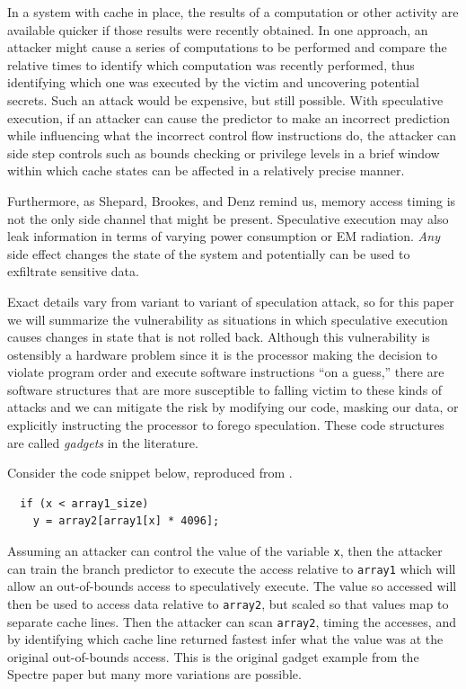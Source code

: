 \documentclass[11pt,conference]{IEEEtran}
\begin{document}
In a system with cache in place, the results of a computation or other activity are available quicker if those results were recently obtained.
In one approach, an attacker might cause a series of computations to be performed and compare the relative times to identify which computation was recently performed, thus identifying which one was executed by the victim and uncovering potential secrets.
Such an attack would be expensive, but still possible.
With speculative execution, if an attacker can cause the predictor to make an incorrect prediction while influencing what the incorrect control flow instructions do, the attacker can side step controls such as bounds checking or privilege levels in a brief window within which cache states can be affected in a relatively precise manner.

Furthermore, as Shepard, Brookes, and Denz\cite{shepherd2022transient} remind us, memory access timing is not the only side channel that might be present.
Speculative execution may also leak information in terms of varying power consumption or EM radiation.
\emph{Any} side effect changes the state of the system and potentially can be used to exfiltrate sensitive data.

Exact details vary from variant to variant of speculation attack, so for this paper we will summarize the vulnerability as situations in which speculative execution causes changes in state that is not rolled back.
Although this vulnerability is ostensibly a hardware problem since it is the processor making the decision to violate program order and execute software instructions ``on a guess,'' there are software structures that are more susceptible to falling victim to these kinds of attacks and we can mitigate the risk by modifying our code, masking our data, or explicitly instructing the processor to forego speculation.
These code structures are called \emph{gadgets} in the literature.

Consider the code snippet below, reproduced from \cite{spectre}.
\begin{lstlisting}
  if (x < array1_size)
    y = array2[array1[x] * 4096];
\end{lstlisting}
Assuming an attacker can control the value of the variable \texttt{x}, then the attacker can train the branch predictor to execute the access relative to \texttt{array1} which will allow an out-of-bounds access to speculatively execute.
The value so accessed will then be used to access data relative to \texttt{array2}, but scaled so that values map to separate cache lines.
Then the attacker can scan \texttt{array2}, timing the accesses, and by identifying which cache line returned fastest infer what the value was at the original out-of-bounds access.
This is the original gadget example from the Spectre paper but many more variations are possible.
\end{document}
